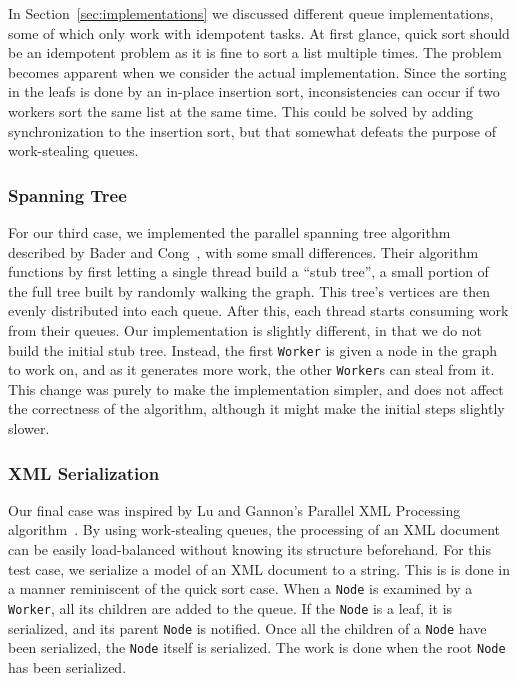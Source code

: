 In Section~\ref{sec:implementations} we discussed different queue implementations, some of which only work with idempotent tasks. At first glance, quick sort should be an idempotent problem as it is fine to sort a list multiple times. The problem becomes apparent when we consider the actual implementation. Since the sorting in the leafs is done by an in-place insertion sort, inconsistencies can occur if two workers sort the same list at the same time. This could be solved by adding synchronization to the insertion sort, but that somewhat defeats the purpose of work-stealing queues.

\subsubsection{Spanning Tree} %
For our third case, we implemented the parallel spanning tree algorithm
described by Bader and Cong~\cite{Bader04afast}, with some small differences.
Their algorithm functions by first letting a single thread build a ``stub
tree'', a small portion of the full tree built by randomly walking the graph.
This tree's vertices are then evenly distributed into each queue. After this,
each thread starts consuming work from their queues. Our implementation is
slightly different, in that we do not build the initial stub tree. Instead, the
first \texttt{Worker} is given a node in the graph to work on, and as it
generates more work, the other \texttt{Worker}s can steal from it. This change
was purely to make the implementation simpler, and does not affect the
correctness of the algorithm, although it might make the initial steps slightly
slower.

\subsubsection{XML Serialization} %
Our final case was inspired by Lu and Gannon's Parallel XML
Processing algorithm~\cite{Lu:2007:PXP:1272457.1272462}. By using work-stealing queues,
the processing of an XML document can be easily load-balanced without knowing
its structure beforehand. For this test case, we serialize a model of an XML
document to a string. This is is done in a manner reminiscent of the quick sort
case. When a \texttt{Node} is examined by a \texttt{Worker}, all its children
are added to the queue. If the \texttt{Node} is a leaf, it is serialized, and
its parent \texttt{Node} is notified. Once all the children of a \texttt{Node}
have been serialized, the \texttt{Node} itself is serialized. The work is done
when the root \texttt{Node} has been serialized.

